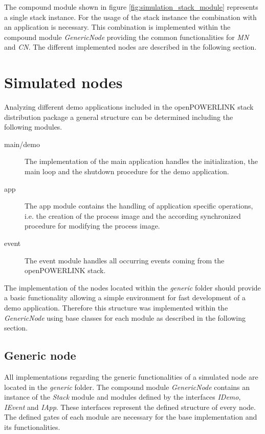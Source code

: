 The compound module shown in figure  \ref{fig:simulation_stack_module} represents a single stack instance.
For the usage of the stack instance the combination with an application is necessary.
This combination is implemented within the compound module \emph{GenericNode} providing the common functionalities for \emph{MN} and \emph{CN}.
The different implemented nodes are described in the following section.

\section{Simulated nodes}
\label{sec:porting_nodes}
Analyzing different demo applications included in the openPOWERLINK stack distribution package a general structure can be determined including the following modules.

\begin{description}
    \item[main/demo] The implementation of the main application handles the initialization, the main loop and the shutdown procedure for the demo application.
    \item[app] The app module contains the handling of application specific operations, i.e. the creation of the process image and the according synchronized procedure for modifying the process image.
    \item[event] The event module handles all occurring events coming from the openPOWERLINK stack.
\end{description}

The implementation of the nodes located within the \emph{generic} folder should provide a basic functionality allowing a simple environment for fast development of a demo application.
Therefore this structure was implemented within the \emph{GenericNode} using base classes for each module as described in the following section.

\subsection{Generic node}
\label{sec:porting_nodes_generic}
All implementations regarding the generic functionalities of a simulated node are located in the \emph{generic} folder.
The compound module \emph{GenericNode} contains an instance of the \emph{Stack} module and modules defined by the interfaces \emph{IDemo}, \emph{IEvent} and \emph{IApp}.
These interfaces represent the defined structure of every node.
The defined gates of each module are necessary for the base implementation and its functionalities.

